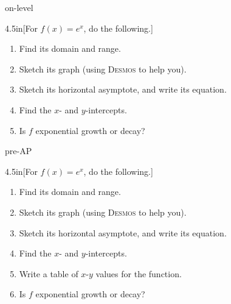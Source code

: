 \begin{taggedblock}{on-level}
    \begin{myWideProblem}{4.5in}[For $f(x) = e^x$, do the following.]
        {
            \small
            \begin{minipage}{0.54\textwidth}
                \begin{enumerate}[nosep]
                    \item Find its domain and range.
                    \item Sketch its graph (using {\scshape Desmos} to help you).
                    \item Sketch its horizontal asymptote, and write its equation.
                \end{enumerate}
            \end{minipage}
            \hfil
            \begin{minipage}{0.45\textwidth}
                \begin{enumerate}[nosep]
                    \setcounter{enumi}{3}
                    \item Find the $x$- and $y$-intercepts.
                    \item Is $f$ exponential growth or decay?
                \end{enumerate}
            \end{minipage}
        }
    \end{myWideProblem}
\end{taggedblock}
\begin{taggedblock}{pre-AP}
    \begin{myWideProblem}{4.5in}[For $f(x) = e^x$, do the following.]
        {
            \small
            \begin{minipage}{0.54\textwidth}
                \begin{enumerate}[nosep]
                    \item Find its domain and range.
                    \item Sketch its graph (using {\scshape Desmos} to help you).
                    \item Sketch its horizontal asymptote, and write its equation.
                \end{enumerate}
            \end{minipage}
            \hfil
            \begin{minipage}{0.45\textwidth}
                \begin{enumerate}[nosep]
                    \setcounter{enumi}{3}
                    \item Find the $x$- and $y$-intercepts.
                    \item Write a table of $x$-$y$ values for the function.
                    \item Is $f$ exponential growth or decay?
                \end{enumerate}
            \end{minipage}
        }
    \end{myWideProblem}
\end{taggedblock}






